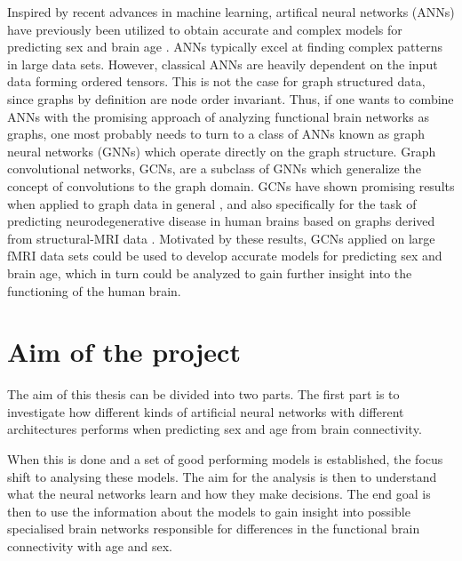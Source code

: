 Inspired by recent advances in machine learning, artifical neural networks (ANNs) have previously been utilized to obtain accurate and complex models for predicting sex and brain age \cite{amoroso_multiplex_age, stankeviciute, arslan}. ANNs typically excel at finding complex patterns in large data sets. However, classical ANNs are heavily dependent on the input data forming ordered tensors. This is not the case for graph structured data, since graphs by definition are node order invariant. Thus, if one wants to combine ANNs with the promising approach of analyzing functional brain networks as graphs, one most probably needs to turn to a class of ANNs known as graph neural networks (GNNs)  which operate directly on the graph structure. Graph convolutional networks, GCNs, are a subclass of GNNs which generalize the concept of convolutions to the graph domain. GCNs have shown promising results when applied to graph data in general \cite{kipf_semi_supervised, kipf_vae, wu_review}, and also specifically for the task of predicting neurodegenerative disease in human brains based on graphs derived from structural-MRI data \cite{jansson_sandstrom}. Motivated by these results, GCNs applied on large fMRI data sets could be used to develop accurate models for predicting sex and brain age, which in turn could be analyzed to gain further insight into the functioning of the human brain.



\section{Aim of the project}
The aim of this thesis can be divided into two parts. The first part is to investigate how different kinds of artificial neural networks with different architectures performs when predicting sex and age from brain connectivity.

When this is done and a set of good performing models is established, the focus shift to analysing these models. The aim for the analysis is then to understand what the neural networks learn and how they make decisions. The end goal is then to use the information about the models to gain insight into possible specialised brain networks responsible for differences in the functional brain connectivity with age and sex.

